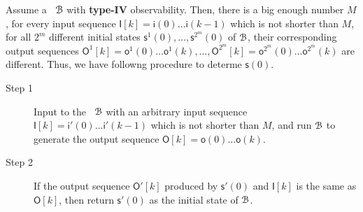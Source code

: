 \begin{enumerate}
Assume a \BCN\ ${\mathcal{B}}$  with {\bf type-IV}  observability. Then, there is a big enough number $M$, for every  input sequence $\mathsf{I}[k]=\mathsf{i}(0)\ldots \mathsf{i}(k-1)$ which is not shorter than $M$,   for all ${2^m}$ different initial states $\mathsf{s}^1(0),\ldots, \mathsf{s}^{2^m}(0)$ of ${\mathcal{B}}$, their corresponding output sequences $\mathsf{O}^1[k]=\mathsf{o}^1(0)\ldots\mathsf{o}^1(k),\ldots, \mathsf{O}^{2^m}[k]=\mathsf{o}^{2^m}(0)\ldots\mathsf{o}^{2^m}(k)$ are different. Thus, we have followng procedure to determe $\mathsf{s}(0)$.
 \begin{description}
	\item[Step 1]  Input to the \BCN\ ${\mathcal{B}}$ with an arbitrary input sequence $\mathsf{I}[k]=\mathsf{i}'(0)\ldots \mathsf{i}'(k-1)$ which is not shorter than $M$, and run ${\mathcal{B}}$ to generate the output sequence $\mathsf{O}[k]=\mathsf{o}(0)\ldots\mathsf{o}(k)$.
	\item[Step 2]  If the output sequence $\mathsf{O}'[k]$ produced by $\mathsf{s}'(0)$ and $\mathsf{I}[k]$ is the same as $\mathsf{O}[k]$, then return $\mathsf{s}'(0)$ as the initial state of ${\mathcal{B}}$.
\end{description}
\end{enumerate}

